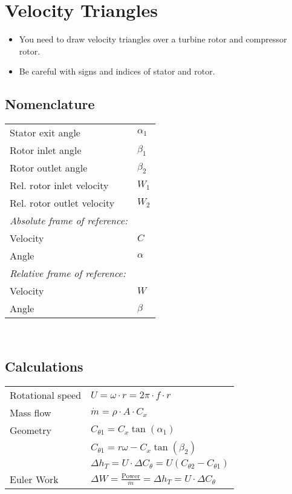 




\section*{Velocity Triangles}
\begin{itemize}
	\item You need to draw velocity triangles over a turbine rotor and compressor rotor.
	\item Be careful with signs and indices of stator and rotor.
\end{itemize}

\subsection*{Nomenclature} 
\begin{tabular}{ m{5cm} l}
	Stator exit angle & $\alpha_1$\\
	Rotor inlet angle & $\beta_1$ \\
	Rotor outlet angle & $\beta_2$ \\
	Rel. rotor inlet velocity & $W_1$ \\
	Rel. rotor outlet velocity & $W_2$ \\
   \textit{ Absolute frame of reference:} & \\
    Velocity & $C$ \\
    Angle & $\alpha$ \\
    \textit{Relative frame of reference:} & \\
    Velocity & $W$ \\
    Angle & $\beta$ \\
\end{tabular} \\

\subsection*{Calculations} 
\begin{tabular}{ m{5cm} l}
	Rotational speed & $U = \omega \cdot r = 2 \pi \cdot f \cdot r$ \\
	Mass flow & $\dot{m} = \rho \cdot A \cdot C_x $ \\
	Geometry & $C_{\theta 1 } = C_x \tan( \alpha_1 ) $ \\
		& $C_{\theta 1} = r \omega - C_x \tan \left( \beta_2 \right) $ \\
		& $\Delta h_T = U \cdot \Delta C_\theta = U \left(C_{\theta 2} - C _{\theta 1} \right) $ \\
	Euler Work & $\Delta W = \frac{\text{Power}}{\dot{m}} = \Delta h_T = U \cdot \Delta C_\theta$
\end{tabular}


